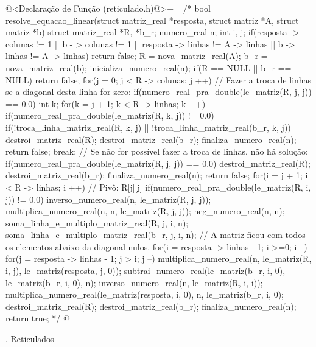 \iniciocodigo
@<Declaração de Função (reticulado.h)@>+=
/*
bool resolve_equacao_linear(struct matriz_real *resposta,
                           struct matriz *A, struct matriz *b){
  struct matriz_real *R, *b_r;
  numero_real n;
  int i, j;
  if(resposta -> colunas != 1 || b - > colunas != 1 ||
     resposta -> linhas != A -> linhas || b -> linhas != A -> linhas)
    return false;
  R = nova_matriz_real(A);
  b_r = nova_matriz_real(b);
  inicializa_numero_real(n);
  if(R == NULL || b_r == NULL)
    return false;
  for(j = 0; j < R -> colunas; j ++){
    // Fazer a troca de linhas se a diagonal desta linha for zero:
    if(numero_real_pra_double(le_matriz(R, j, j)) == 0.0){
      int k;
      for(k = j + 1; k < R -> linhas; k ++){
        if(numero_real_pra_double(le_matriz(R, k, j)) != 0.0){
          if(!troca_linha_matriz_real(R, k, j) ||
             !troca_linha_matriz_real(b_r, k, j)){
            destroi_matriz_real(R);
            destroi_matriz_real(b_r);
            finaliza_numero_real(n);
            return false;
          }
          break;
        }
        // Se não for possível fazer a troca de linhas, não há solução:
        if(numero_real_pra_double(le_matriz(R, j, j)) == 0.0){
          destroi_matriz_real(R);
          destroi_matriz_real(b_r);
          finaliza_numero_real(n);
          return false;
        }
      }
    }
    for(i = j + 1; i < R -> linhas; i ++){
      // Pivô: R[j][j]
      if(numero_real_pra_double(le_matriz(R, i, j)) != 0.0){
        inverso_numero_real(n, le_matriz(R, j, j));
        multiplica_numero_real(n, n, le_matriz(R, j, j));
        neg_numero_real(n, n);
        soma_linha_e_multiplo_matriz_real(R, j, i, n);
        soma_linha_e_multiplo_matriz_real(b_r, j, i, n);
      }
    }
  }
  // A matriz ficou com todos os elementos abaixo da diagonal nulos.
  for(i = resposta -> linhas - 1; i >=0; i --){
    for(j = resposta -> linhas - 1; j > i; j --){
      multiplica_numero_real(n, le_matriz(R, i, j),
                             le_matriz(resposta, j, 0));
      subtrai_numero_real(le_matriz(b_r, i, 0), le_matriz(b_r, i, 0), n);
    }
    inverso_numero_real(n, le_matriz(R, i, i));
    multiplica_numero_real(le_matriz(resposta, i, 0), n,
                           le_matriz(b_r, i, 0);
  }
  destroi_matriz_real(R);
  destroi_matriz_real(b_r);
  finaliza_numero_real(n);
  return true;
}
*/
@
\fimcodigo



{\twelvebold {}. Reticulados}


\vskip0.5cm

